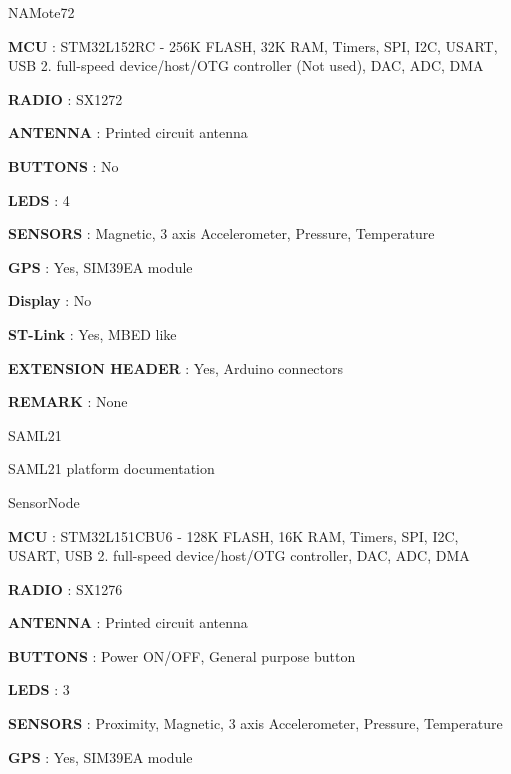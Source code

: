 \begin{DoxyItemize}
\begin{DoxyItemize}
\end{DoxyItemize}
\item N\+A\+Mote72
\begin{DoxyItemize}
\item {\bfseries M\+CU} \+: S\+T\+M32\+L152\+RC -\/ 256K F\+L\+A\+SH, 32K R\+AM, Timers, S\+PI, I2C, U\+S\+A\+RT, U\+SB 2. full-\/speed device/host/\+O\+TG controller (Not used), D\+AC, A\+DC, D\+MA
\item {\bfseries R\+A\+D\+IO} \+: S\+X1272
\item {\bfseries A\+N\+T\+E\+N\+NA} \+: Printed circuit antenna
\item {\bfseries B\+U\+T\+T\+O\+NS} \+: No
\item {\bfseries L\+E\+DS} \+: 4
\item {\bfseries S\+E\+N\+S\+O\+RS} \+: Magnetic, 3 axis Accelerometer, Pressure, Temperature
\item {\bfseries G\+PS} \+: Yes, S\+I\+M39\+EA module
\item {\bfseries Display} \+: No
\item {\bfseries S\+T-\/\+Link} \+: Yes, M\+B\+ED like
\item {\bfseries E\+X\+T\+E\+N\+S\+I\+ON H\+E\+A\+D\+ER} \+: Yes, Arduino connectors
\item {\bfseries R\+E\+M\+A\+RK} \+: None
\end{DoxyItemize}
\item S\+A\+M\+L21
\begin{DoxyItemize}
\item S\+A\+M\+L21 platform documentation
\end{DoxyItemize}
\item Sensor\+Node
\begin{DoxyItemize}
\item {\bfseries M\+CU} \+: S\+T\+M32\+L151\+C\+B\+U6 -\/ 128K F\+L\+A\+SH, 16K R\+AM, Timers, S\+PI, I2C, U\+S\+A\+RT, U\+SB 2. full-\/speed device/host/\+O\+TG controller, D\+AC, A\+DC, D\+MA
\item {\bfseries R\+A\+D\+IO} \+: S\+X1276
\item {\bfseries A\+N\+T\+E\+N\+NA} \+: Printed circuit antenna
\item {\bfseries B\+U\+T\+T\+O\+NS} \+: Power O\+N/\+O\+FF, General purpose button
\item {\bfseries L\+E\+DS} \+: 3
\item {\bfseries S\+E\+N\+S\+O\+RS} \+: Proximity, Magnetic, 3 axis Accelerometer, Pressure, Temperature
\item {\bfseries G\+PS} \+: Yes, S\+I\+M39\+EA module

\end{DoxyItemize}
\end{DoxyItemize}
